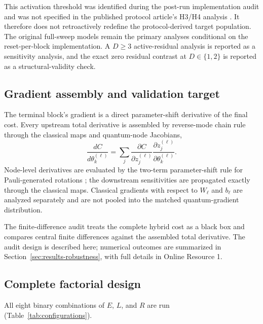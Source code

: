 \documentclass[pdflatex,sn-basic,Numbered]{sn-jnl}
\begin{document}
This activation threshold was identified during the post-run implementation audit and was not specified in the published protocol article's H3/H4 analysis \cite{shen2026gradient}. It therefore does not retroactively redefine the protocol-derived target population. The original full-sweep models remain the primary analyses conditional on the reset-per-block implementation. A $D\ge3$ active-residual analysis is reported as a sensitivity analysis, and the exact zero residual contrast at $D\in\{1,2\}$ is reported as a structural-validity check.

\subsection{Gradient assembly and validation target}

The terminal block's gradient is a direct parameter-shift derivative of the final cost. Every upstream total derivative is assembled by reverse-mode chain rule through the classical maps and quantum-node Jacobians,
\[
\frac{dC}{d\theta_k^{(\ell)}}
=\sum_j
\frac{\partial C}{\partial z_j^{(\ell)}}
\frac{\partial z_j^{(\ell)}}{\partial\theta_k^{(\ell)}}.
\]
Node-level derivatives are evaluated by the two-term parameter-shift rule for Pauli-generated rotations \cite{mitarai2018quantum,schuld2019evaluating}; the downstream sensitivities are propagated exactly through the classical maps. Classical gradients with respect to $W_\ell$ and $b_\ell$ are analyzed separately and are not pooled into the matched quantum-gradient distribution.

The finite-difference audit treats the complete hybrid cost as a black box and compares central finite differences against the assembled total derivative. The audit design is described here; numerical outcomes are summarized in Section~\ref{sec:results-robustness}, with full details in Online Resource 1.

\subsection{Complete factorial design}

All eight binary combinations of $E$, $L$, and $R$ are run (Table~\ref{tab:configurations}).
\end{document}
